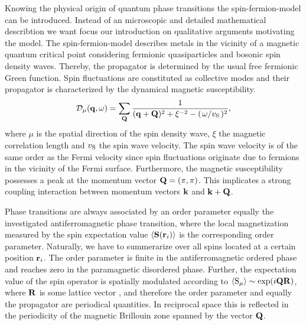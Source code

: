 Knowing the physical origin of quantum phase transitions the spin-fermion-model can be introduced.
Instead of an microscopic and detailed mathematical describtion we want focus our introduction on qualitative arguments motivating the model.
The spin-fermion-model describes metals in the vicinity of a magnetic quantum critical point considering fermionic quasiparticles and bosonic spin density waves.
Thereby, the propagator is determined by the usual free fermionic Green function.
Spin fluctuations are constituted as collective modes and their propagator is characterized by the dynamical magnetic susceptibility.
%
\begin{align}
	\mathcal{D}_{\mu}(\vb{q}, \omega) = \sum\limits_{\vb{Q}} \frac{1}{(\vb{q}+\vb{Q})^{2} + \xi^{-2} - (\flatfrac{\omega}{v_{\mt{S}}})^{2}},
	\label{eq:undamped spin propagator}
\end{align}
%
where $\mu$ is the spatial direction of the spin density wave, $\xi$ the magnetic correlation length and $v_{\mathrm{S}}$ the spin wave velocity.
The spin wave velocity is of the same order as the Fermi velocity since spin fluctuations originate due to fermions in the vicinity of the Fermi surface.
Furthermore, the magnetic susceptibility possesses a peak at the momentum vector $\vb{Q} = (\pi, \pi)$.
This implicates a strong coupling interaction between momentum vectors $\vb{k}$ and $\vb{k} + \vb{Q}$.

Phase transitions are always associated by an order parameter equally the investigated antiferromagnetic phase transition, where the local magnetization measured by the spin expectation value $\expval{\vb{S}(\vb{r}_{i})}$ is the corresponding order parameter.
Naturally, we have to summerarize over all spins located at a certain position $\vb{r}_{i}$.
The order parameter is finite in the antiferromagnetic ordered phase and reaches zero in the paramagnetic disordered phase.
Further, the expectation value of the spin operator is spatially modulated according to $\expval{\mathrm{S}_{\mu}} \sim \exp({i\vb{Q}\vb{R}})$, where $\vb{R}$ is some lattice vector \cite{Weiss}, and therefore the order parameter and equally the propagator are periodical quantities.
In reciprocal space this is reflected in the periodicity  of the magnetic Brillouin zone spanned by the vector $\vb{Q}$.

